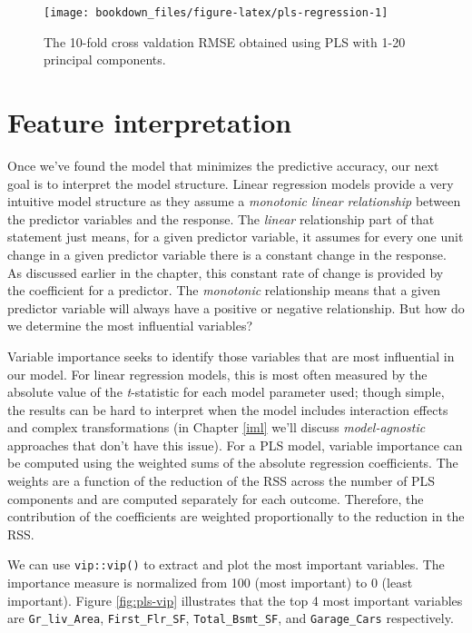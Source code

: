 \documentclass[]{krantz}
\begin{document}
\begin{figure}

{\centering \texttt{[image: bookdown\_files/figure-latex/pls-regression-1]} 

}

\caption{The 10-fold cross valdation RMSE obtained using PLS with 1-20 principal components.}\label{fig:pls-regression}
\end{figure}

\hypertarget{lm-model-interp}{%
\section{Feature interpretation}\label{lm-model-interp}}

Once we've found the model that minimizes the predictive accuracy, our next goal is to interpret the model structure. Linear regression models provide a very intuitive model structure as they assume a \emph{monotonic linear relationship} between the predictor variables and the response. The \emph{linear} relationship part of that statement just means, for a given predictor variable, it assumes for every one unit change in a given predictor variable there is a constant change in the response. As discussed earlier in the chapter, this constant rate of change is provided by the coefficient for a predictor. The \emph{monotonic} relationship means that a given predictor variable will always have a positive or negative relationship. But how do we determine the most influential variables?

Variable importance seeks to identify those variables that are most influential in our model. For linear regression models, this is most often measured by the absolute value of the \emph{t}-statistic for each model parameter used; though simple, the results can be hard to interpret when the model includes interaction effects and complex transformations (in Chapter \ref{iml} we'll discuss \emph{model-agnostic} approaches that don't have this issue). For a PLS model, variable importance can be computed using the weighted sums of the absolute regression coefficients. The weights are a function of the reduction of the RSS across the number of PLS components and are computed separately for each outcome. Therefore, the contribution of the coefficients are weighted proportionally to the reduction in the RSS.

We can use \texttt{vip::vip()} to extract and plot the most important variables. The importance measure is normalized from 100 (most important) to 0 (least important). Figure \ref{fig:pls-vip} illustrates that the top 4 most important variables are \texttt{Gr\_liv\_Area}, \texttt{First\_Flr\_SF}, \texttt{Total\_Bsmt\_SF}, and \texttt{Garage\_Cars} respectively.
\end{document}
